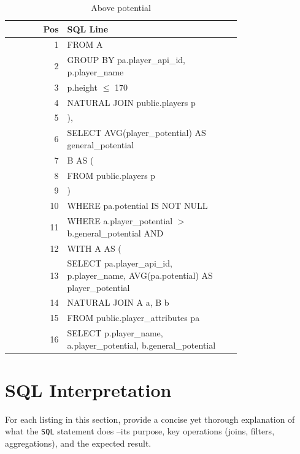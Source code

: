 \documentclass{article}
\begin{document}
\begin{table}[t]
  \centering
  \caption{Above potential}
  \label{tab:potential}
  \begin{tabular}{r p{0.75\linewidth}}
    \toprule
    \textbf{Pos}
    & \textbf{SQL Line} \\
    \midrule
    1
    &   FROM A \\
    2
    &   GROUP BY pa.player\_api\_id, p.player\_name \\
    3
    & 	p.height $\leq$ 170 \\
    4
    &   NATURAL JOIN public.players p \\
    5
    & ), \\
    6
    &   SELECT AVG(player\_potential) AS general\_potential \\
    7
    & B AS ( \\
    8
    & FROM public.players p \\
    9
    & ) \\
    10
    &   WHERE pa.potential IS NOT NULL \\
    11
    & WHERE a.player\_potential $>$ b.general\_potential AND \\
    12
    & WITH A AS ( \\
    13
    &   SELECT pa.player\_api\_id, p.player\_name, AVG(pa.potential) AS player\_potential \\
    14
    & NATURAL JOIN A a, B b \\
    15
    &   FROM public.player\_attributes pa \\
    16
    & SELECT p.player\_name, a.player\_potential, b.general\_potential \\
    \bottomrule
  \end{tabular}
\end{table}

\section{SQL Interpretation}

For each listing in this section, provide a concise yet thorough explanation of what the \texttt{SQL} statement does --its purpose, key operations (joins, filters, aggregations), and the expected result.
\end{document}
